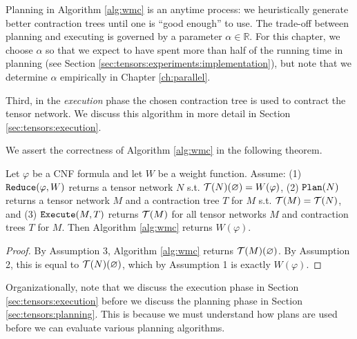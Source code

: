 Planning in Algorithm \ref{alg:wmc} is an anytime process: we heuristically generate better contraction trees until one is ``good enough'' to use. The trade-off between planning and executing is governed by a parameter $\alpha \in \mathbb{R}$. 
For this chapter, we choose $\alpha$ so that we expect to have spent more than half of the running time in planning (see Section \ref{sec:tensors:experiments:implementation}), but note that we determine $\alpha$ empirically in Chapter \ref{ch:parallel}.

Third, in the \emph{execution} phase the chosen contraction tree is used to contract the tensor network. We discuss this algorithm in more detail in Section \ref{sec:tensors:execution}.

We assert the correctness of Algorithm \ref{alg:wmc} in the following theorem.
\begin{theorem}
\label{thm:alg-correctness}
Let $\varphi$ be a CNF formula and let $W$ be a weight function. 
    Assume:
    (1) $\texttt{\upshape Reduce}(\varphi, W)$ returns a tensor network $N$ s.t. $\mathcal{T}(N)(\varnothing) = W(\varphi)$,
    (2) $\texttt{\upshape Plan}(N)$ returns a tensor network $M$ and a contraction tree $T$ for $M$ s.t. $\mathcal{T}(M) = \mathcal{T}(N)$, and
    (3) $\texttt{\upshape Execute}(M, T)$ returns $\mathcal{T}(M)$ for all tensor networks $M$ and contraction trees $T$ for $M$.
Then Algorithm \ref{alg:wmc} returns $W(\varphi)$.
\end{theorem}
\begin{proof}
By Assumption 3, Algorithm \ref{alg:wmc} returns $\mathcal{T}(M)(\varnothing)$. 
By Assumption 2, this is equal to $\mathcal{T}(N)(\varnothing)$, which by Assumption 1 is exactly $W(\varphi)$.
\end{proof}

Organizationally, note that we discuss the execution phase in Section \ref{sec:tensors:execution} before we discuss the planning phase in Section \ref{sec:tensors:planning}. 
This is because we must understand how plans are used before we can evaluate various planning algorithms.


